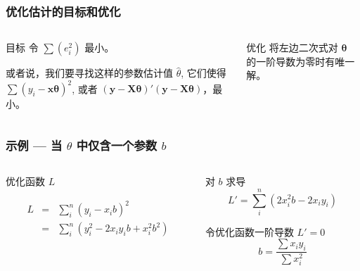\documentclass[serif,aspectratio=169]{beamer}
\begin{document}
\begin{frame}
  \frametitle{优化估计的目标和优化}
  \begin{columns}
    \begin{column}{.5\textwidth}
      \begin{block}{目标}
        \hspace{2em}令 $\sum(e_i^2)$ 最小。

        \hspace{2em}或者说，我们要寻找这样的参数估计值 $\hat{\theta}$, 它们使得 $\sum(y_i-\mathbf{x\theta})^2$, 或者 $\mathbf{(y-X\theta)'(y-X\theta)}$，最小。
      \end{block}
    \end{column}
    \pause
    \begin{column}{.5\textwidth}
      \begin{block}{优化}
        \hspace{2em}将左边二次式对 $\mathbf{\theta}$ 的一阶导数为零时有唯一解。
      \end{block}
    \end{column}
  \end{columns}
\end{frame}


\begin{frame}
  \frametitle{示例 — 当 $\theta$ 中仅含一个参数 $b$}
  \begin{columns}
    \begin{column}{0.5\textwidth}
      \begin{block}{优化函数 $L$}
        
        $$
        \begin{array}{rcl}
          L & = & \sum_i^n(y_i-x_ib)^2\\
          & = & \sum_i^n(y_i^2-2x_iy_ib+x_i^2b^2)
        \end{array}
        $$
        
      \end{block}
    \end{column}
    \pause
    \begin{column}{.5\textwidth}
      \begin{block}{对 $b$ 求导}
        $$L'=\sum_i^n(2x_i^2b-2x_iy_i)$$
      \end{block}
      \begin{block}{令优化函数一阶导数 $L'=0$}
        $$b=\frac{\sum x_iy_i}{\sum x_i^2}$$
      \end{block}
    \end{column}
  \end{columns}
\end{frame}
\end{document}
